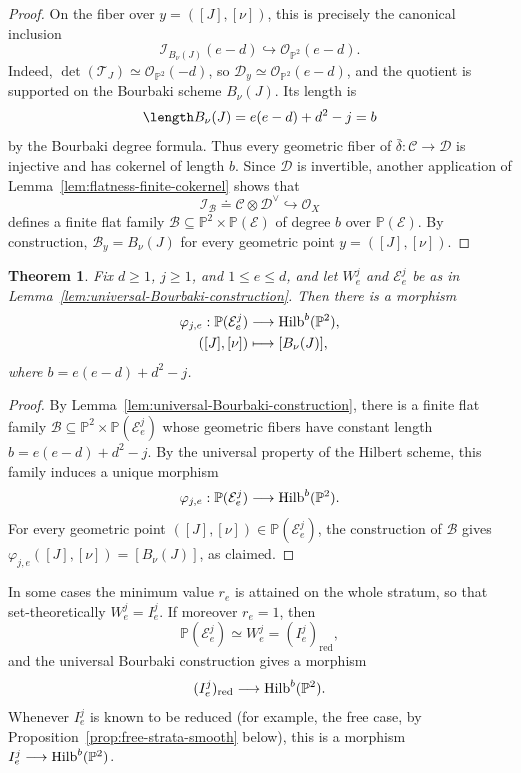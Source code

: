 \documentclass[11pt]{amsart} %
\newcommand{\lar}{\longrightarrow}
\newtheorem{Theorem}{Theorem}[section]
\theoremstyle{definition}
\def\NZQ{\mathbb}               %
\def\PP{{\NZQ P}}
\def\T{{\mathcal T}}
\def\Hilbert{{\rm Hilb}}
\begin{document}
\begin{proof}
On the fiber over $y=([J],[\nu])$, this is precisely the canonical
inclusion
\[
\mathcal I_{B_\nu(J)}(e-d)
\hookrightarrow
\mathcal O_{\PP^2}(e-d).
\]
Indeed, \(\det(\T_J)\simeq\mathcal O_{\PP^2}(-d)\), so \(\mathcal D_y
\simeq
\mathcal O_{\PP^2}(e-d)\),
and the quotient is supported on the Bourbaki scheme $B_\nu(J)$.
Its length is
\[
\length B_\nu(J)
=
e(e-d)+d^2-j
=
b
\]
by the Bourbaki degree formula. Thus every geometric fiber of \(\bar\delta:\mathcal C\lar\mathcal D
\) is injective and has cokernel of length $b$. Since $\mathcal D$ is
invertible, another application of
Lemma~\ref{lem:flatness-finite-cokernel} shows that
\[
\mathcal I_{\mathcal B}
\doteq
\mathcal C\otimes\mathcal D^\vee
\hookrightarrow
\mathcal O_X
\]
defines a finite flat family \(\mathcal B\subseteq\PP^2\times \mathbb{P}(\mathcal{E})
\) of degree $b$ over $\mathbb{P}(\mathcal{E})$. By construction, \(
\mathcal B_y=B_\nu(J)\) for every geometric point $y=([J],[\nu])$.
\end{proof}

\begin{Theorem}\label{thm:morphism-Bourbaki-scheme}
Fix $d\geq1$, $j\geq1$, and $1\leq e\leq d$, and let
$W_e^j$ and $\mathcal E_e^j$ be as in
Lemma~\ref{lem:universal-Bourbaki-construction}. Then there is a
morphism
\[
\begin{aligned}
\varphi_{j,e}:\PP(\mathcal E_e^j)
&\longrightarrow
\Hilbert^b(\PP^2),\\
([J],[\nu])
&\longmapsto
[B_\nu(J)],
\end{aligned}
\]
where \(b=e(e-d)+d^2-j\).
\end{Theorem}

\begin{proof}
By Lemma~\ref{lem:universal-Bourbaki-construction}, there is a finite
flat family
\(
\mathcal B\subseteq\PP^2\times \mathbb{P}(\mathcal{E}_e^j)
\)
whose geometric fibers have constant length \(b=e(e-d)+d^2-j\). By the universal property of the Hilbert scheme, this family induces
a unique morphism
\[
\varphi_{j,e}:
\mathbb{P}(\mathcal{E}_e^j)
\longrightarrow
\Hilbert^b(\PP^2).
\]
For every geometric point \(
([J],[\nu])\in \mathbb{P}(\mathcal{E}_e^j)
\), the construction of $\mathcal B$ gives \(
\varphi_{j,e}([J],[\nu])=[B_\nu(J)]\), as claimed.
\end{proof}

In some cases the minimum value $r_e$ is attained on the whole
stratum, so that set-theoretically $W_e^j=I_e^j$. If moreover
$r_e=1$, then
\[
\PP(\mathcal E_e^j)\simeq W_e^j=(I_e^j)_{\mathrm{red}},
\]
and the universal Bourbaki construction gives a morphism
\[
(I_e^j)_{\mathrm{red}}
\longrightarrow
\Hilbert^b(\PP^2).
\]
Whenever $I_e^j$ is known to be reduced (for example, the free case, by Proposition~\ref{prop:free-strata-smooth} below), this is a morphism \(I_e^j\longrightarrow\Hilbert^b(\PP^2)\).
\end{document}
